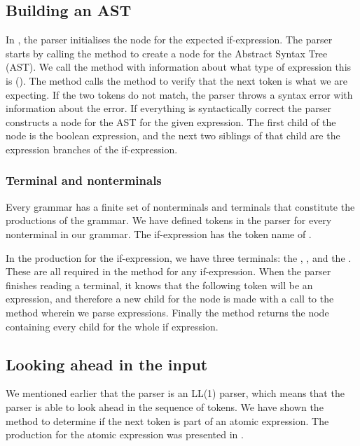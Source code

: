\subsection{Building an AST}
In , the parser initialises the node for the
expected if-expression. The parser starts by calling the method
 to create a node for the Abstract Syntax Tree (AST).
We call the method with information about what type of expression this
is (). The method calls the  method
to verify that the next token is what we are expecting. If the two
tokens do not match, the parser throws a syntax error with information
about the error. If everything is syntactically correct the parser
constructs a node for the AST for the given expression. The first child
of the node is the boolean expression, and the next two siblings of that
child are the expression branches of the if-expression.

\subsubsection{Terminal and nonterminals}
Every grammar has a finite set of nonterminals and terminals that
constitute the productions of the grammar. We have defined tokens in the
parser for every nonterminal in our grammar. The if-expression has the
token name of .

In the production for the if-expression, we have three terminals: the ,
, and the . These are all required in the method for any
if-expression. When the parser finishes reading a terminal, it knows that the
following token will be an expression, and therefore a new child for the node is
made with a call to the  method wherein we parse
expressions. Finally the method returns the node containing every child for the
whole if expression.

\subsection{Looking ahead in the input}
We mentioned earlier that the parser is an LL(1) parser, which means that the
parser is able to look ahead in the sequence of tokens. We have shown the
 method to determine if the next token is part of an
atomic expression. The production for the atomic expression was presented in
.

